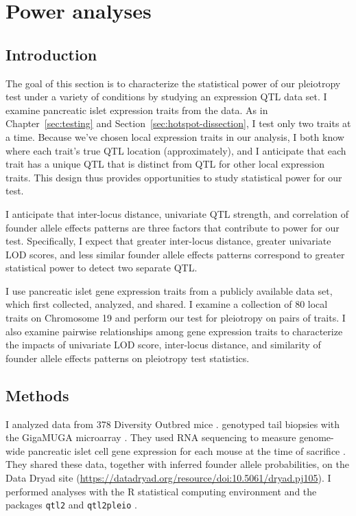 \documentclass[oneside]{book}\usepackage[]{graphicx}\usepackage[]{color}
\begin{document}
\section{Power analyses}\label{sec:power-analyses}

\subsection{Introduction}

The goal of this section is to characterize the statistical power of our pleiotropy test under a variety of conditions by studying an expression QTL data set. 
I examine pancreatic islet expression traits from the \citet{keller2018genetic} data. 
As in Chapter~\ref{sec:testing} and Section~\ref{sec:hotspot-dissection}, I test only two traits at a time. 
Because we’ve chosen local expression traits in our analysis, I both know where each trait’s true QTL location (approximately), 
and I anticipate that each trait has a unique QTL that is distinct from QTL for other local expression traits. 
This design thus provides opportunities to study statistical power for our test.

I anticipate that inter-locus distance, univariate QTL strength, and correlation of founder allele effects patterns are three factors that contribute to power for our test. 
Specifically, I expect that greater inter-locus distance, greater univariate LOD scores, and less similar founder allele effects patterns correspond to greater statistical power to detect two separate QTL.

I use pancreatic islet gene expression traits from a publicly available data set, which \citet{keller2018genetic} first collected, analyzed, and shared. 
I examine a collection of 80 local traits on Chromosome 19 and perform our test for pleiotropy on pairs of traits. 
I also examine pairwise relationships among gene expression traits to characterize the impacts of univariate LOD score, 
inter-locus distance, and similarity of founder allele effects patterns on pleiotropy test statistics.



\subsection{Methods}


I analyzed data from 378 Diversity Outbred mice \citep{keller2018genetic}. \citet{keller2018genetic} genotyped tail biopsies with the GigaMUGA microarray \citep{morgan2016mouse}. They used RNA sequencing to measure genome-wide pancreatic islet cell gene expression for each mouse at the time of sacrifice \citep{keller2018genetic}. They shared these data, together with inferred founder allele probabilities, on the Data Dryad site (\url{https://datadryad.org/resource/doi:10.5061/dryad.pj105}). I performed analyses with the R statistical computing environment \citep{r} and the packages \texttt{qtl2} \citep{broman2019rqtl2} and \texttt{qtl2pleio} \citep{qtl2pleio}.
\end{document}
